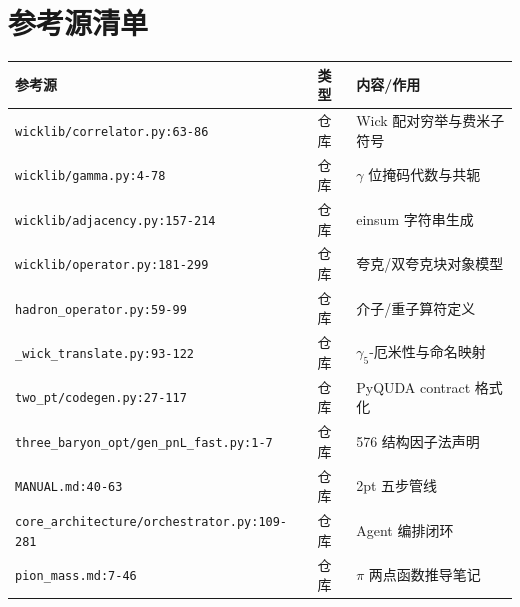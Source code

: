 \documentclass[UTF8]{ctexart}
\begin{document}
\section{参考源清单}
\begin{xltabular}{\textwidth}{llX}
\toprule
\textcolor{evidence}{参考源} & 类型 & 内容/作用 \\
\midrule
\endhead
\nolinkurl{wicklib/correlator.py:63-86} & 仓库 & Wick 配对穷举与费米子符号 \\
\nolinkurl{wicklib/gamma.py:4-78} & 仓库 & $\gamma$ 位掩码代数与共轭 \\
\nolinkurl{wicklib/adjacency.py:157-214} & 仓库 & einsum 字符串生成 \\
\nolinkurl{wicklib/operator.py:181-299} & 仓库 & 夸克/双夸克块对象模型 \\
\nolinkurl{hadron_operator.py:59-99} & 仓库 & 介子/重子算符定义 \\
\nolinkurl{_wick_translate.py:93-122} & 仓库 & $\gamma_5$-厄米性与命名映射 \\
\nolinkurl{two_pt/codegen.py:27-117} & 仓库 & PyQUDA contract 格式化 \\
\nolinkurl{three_baryon_opt/gen_pnL_fast.py:1-7} & 仓库 & 576 结构因子法声明 \\
\nolinkurl{MANUAL.md:40-63} & 仓库 & 2pt 五步管线 \\
\nolinkurl{core_architecture/orchestrator.py:109-281} & 仓库 & Agent 编排闭环 \\
\nolinkurl{pion_mass.md:7-46} & 仓库 & $\pi$ 两点函数推导笔记 \\
\bottomrule
\end{xltabular}

\end{document}

